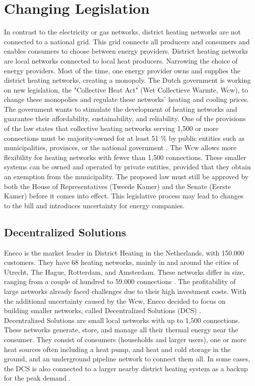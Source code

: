 \section{Changing Legislation}
In contrast to the electricity or gas networks, district heating networks are not connected to a national grid. This grid connects all producers and consumers and enables consumers to choose between energy providers. District heating networks are local networks connected to local heat producers. Narrowing the choice of energy providers. Most of the time, one energy provider owns and supplies the district heating networks, creating a monopoly. The Dutch government is working on new legislation, the "Collective Heat Act" (Wet Collectieve Warmte, Wcw), to change these monopolies and regulate these networks' heating and cooling prices. The government wants to stimulate the development of heating networks and guarantee their affordability, sustainability, and reliability. One of the provisions of the law states that collective heating networks serving 1,500 or more connections must be majority-owned for at least 51 $\%$ by public entities such as municipalities, provinces, or the national government \cite{WcWsite}. The Wcw allows more flexibility for heating networks with fewer than 1,500 connections. These smaller systems can be owned and operated by private entities, provided that they obtain an exemption from the municipality. The proposed law
must still be approved by both the House of Representatives (Tweede Kamer) and the Senate (Eerste Kamer) before it comes into effect. This legislative process may lead to changes to the bill and introduces uncertainty for energy companies.

\subsection{Decentralized Solutions}
Eneco is the market leader in District Heating in the Netherlands, with 150.000 customers. They have 68 heating networks, mainly in and around the cities of Utrecht, The Hague, Rotterdam, and Amsterdam. These networks differ in size, ranging from a couple of hundred to 59.000 connections \cite{warmtenetwerkenEneco}. The profitability of large networks already faced challenges due to their high investment costs. With the additional uncertainty caused by the Wcw, Eneco decided to focus on building smaller networks, called Decentralized Solutions (DCS) \cite{nos2025warmtenetten}. \\

Decentralized Solutions are small local networks with up to 1,500 connections. These networks generate, store, and manage all their thermal energy near the consumer. They consist of consumers (households and larger users), one or more heat sources often including a heat pump, and heat and cold storage in the ground, and an underground pipeline network to connect them all. In some cases, the DCS is also connected to a larger nearby district heating system as a backup for the peak demand \cite{opdracht_eneco}.

